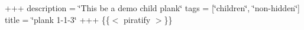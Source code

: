 +++ description = \char`\"{}\+This be a demo child plank\char`\"{} tags = \mbox{[}\char`\"{}children\char`\"{}, \char`\"{}non-\/hidden\char`\"{}\mbox{]} title = \char`\"{}plank 1-\/1-\/3\char`\"{} +++ \{\{$<$ piratify $>$\}\} 